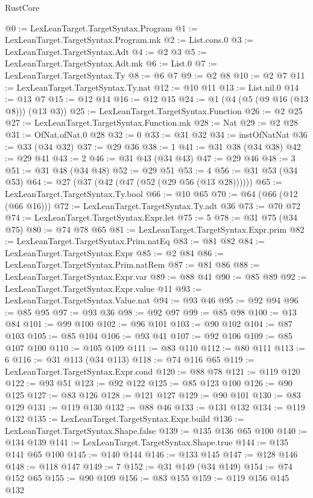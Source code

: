 \begin{lexlean}{RustCore}
\begin{coremodule}
@0 := LexLeanTarget.TargetSyntax.Program
@1 := LexLeanTarget.TargetSyntax.Program.mk
@2 := List.cons.{0}
@3 := LexLeanTarget.TargetSyntax.Adt
@4 := @2 @3
@5 := LexLeanTarget.TargetSyntax.Adt.mk
@6 := List.{0}
@7 := LexLeanTarget.TargetSyntax.Ty
@8 := @6 @7
@9 := @2 @8
@10 := @2 @7
@11 := LexLeanTarget.TargetSyntax.Ty.nat
@12 := @10 @11
@13 := List.nil.{0}
@14 := @13 @7
@15 := @12 @14
@16 := @12 @15
@24 := @1 (@4 (@5 (@9 @16 (@13 @8))) (@13 @3))
@25 := LexLeanTarget.TargetSyntax.Function
@26 := @2 @25
@27 := LexLeanTarget.TargetSyntax.Function.mk
@28 := Nat
@29 := @2 @28
@31 := OfNat.ofNat.{0} @28
@32 := 0
@33 := @31 @32
@34 := instOfNatNat
@36 := @33 (@34 @32)
@37 := @29 @36
@38 := 1
@41 := @31 @38 (@34 @38)
@42 := @29 @41
@43 := 2
@46 := @31 @43 (@34 @43)
@47 := @29 @46
@48 := 3
@51 := @31 @48 (@34 @48)
@52 := @29 @51
@53 := 4
@56 := @31 @53 (@34 @53)
@64 := @27 (@37 (@42 (@47 (@52 (@29 @56 (@13 @28))))))
@65 := LexLeanTarget.TargetSyntax.Ty.bool
@66 := @10 @65
@70 := @64 (@66 (@12 (@66 @16)))
@72 := LexLeanTarget.TargetSyntax.Ty.adt @36
@73 := @70 @72
@74 := LexLeanTarget.TargetSyntax.Expr.let
@75 := 5
@78 := @31 @75 (@34 @75)
@80 := @74 @78 @65
@81 := LexLeanTarget.TargetSyntax.Expr.prim
@82 := LexLeanTarget.TargetSyntax.Prim.natEq
@83 := @81 @82
@84 := LexLeanTarget.TargetSyntax.Expr
@85 := @2 @84
@86 := LexLeanTarget.TargetSyntax.Prim.natRem
@87 := @81 @86
@88 := LexLeanTarget.TargetSyntax.Expr.var
@89 := @88 @41
@90 := @85 @89
@92 := LexLeanTarget.TargetSyntax.Expr.value @11
@93 := LexLeanTarget.TargetSyntax.Value.nat
@94 := @93 @46
@95 := @92 @94
@96 := @85 @95
@97 := @93 @36
@98 := @92 @97
@99 := @85 @98
@100 := @13 @84
@101 := @99 @100
@102 := @96 @101
@103 := @90 @102
@104 := @87 @103
@105 := @85 @104
@106 := @93 @41
@107 := @92 @106
@109 := @85 @107 @100
@110 := @105 @109
@111 := @83 @110
@112 := @80 @111
@113 := 6
@116 := @31 @113 (@34 @113)
@118 := @74 @116 @65
@119 := LexLeanTarget.TargetSyntax.Expr.cond
@120 := @88 @78
@121 := @119 @120
@122 := @93 @51
@123 := @92 @122
@125 := @85 @123 @100
@126 := @90 @125
@127 := @83 @126
@128 := @121 @127
@129 := @90 @101
@130 := @83 @129
@131 := @119 @130
@132 := @88 @46
@133 := @131 @132
@134 := @119 @132
@135 := LexLeanTarget.TargetSyntax.Expr.build
@136 := LexLeanTarget.TargetSyntax.Shape.false
@139 := @135 @136 @65 @100
@140 := @134 @139
@141 := LexLeanTarget.TargetSyntax.Shape.true
@144 := @135 @141 @65 @100
@145 := @140 @144
@146 := @133 @145
@147 := @128 @146
@148 := @118 @147
@149 := 7
@152 := @31 @149 (@34 @149)
@154 := @74 @152 @65
@155 := @90 @109
@156 := @83 @155
@159 := @119 @156 @145 @132

\end{coremodule}
\end{lexlean}
